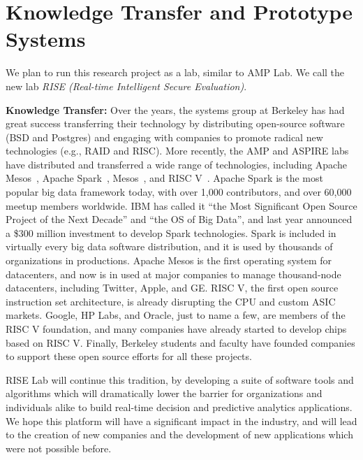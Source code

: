 \section{Knowledge Transfer and Prototype Systems}

We plan to run this research project as a lab, similar to AMP Lab. We call the new lab {\em RISE (Real-time Intelligent Secure Evaluation)}. 

{\bf Knowledge Transfer:} Over the years, the systems group at Berkeley has had great success transferring their technology by distributing open-source software (\eg BSD and Postgres) and engaging with companies to promote radical new technologies (e.g., RAID and RISC).  More recently, the AMP and ASPIRE labs have distributed and transferred a wide range of technologies, including Apache Mesos~\cite{mesos}, Apache Spark~\cite{spark}, Mesos~\cite{mesos}, and RISC V~\cite{risc-v}. Apache Spark is the most popular big data framework today, with over 1,000 contributors, and over 60,000 meetup members worldwide. IBM has called it ``the Most Significant Open Source Project of the Next Decade'' and ``the OS of Big Data'', and last year announced a \$300 million investment to develop Spark technologies. Spark is included in virtually every big data software distribution, and it is used by thousands of organizations in productions. Apache Mesos is the first operating system for datacenters, and now is in used at major companies to manage thousand-node datacenters, including Twitter, Apple, and GE.  RISC V, the first open source instruction set architecture, is already disrupting the CPU and custom ASIC markets. Google, HP Labs, and Oracle, just to name a few, are members of the RISC V foundation, and many companies have already started to develop chips based on RISC V. Finally, Berkeley students and faculty have founded companies to support these open source efforts for all these projects.

RISE Lab will continue this tradition, by developing a suite of software tools and algorithms which will dramatically lower the barrier for organizations and individuals alike to build real-time decision and predictive analytics applications. We hope this platform will have a significant impact in the industry, and will lead to the creation of new companies and the development of new applications which were not possible before.


